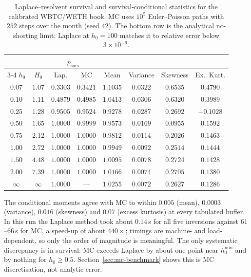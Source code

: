 \documentclass[11pt]{article}
\theoremstyle{plain}
\theoremstyle{definition}
\theoremstyle{remark}
\begin{document}
\begin{table}[ht]
\centering\small
\renewcommand{\arraystretch}{1.15}
\begin{tabular}{cc cc cccc}
\toprule
& & \multicolumn{2}{c}{$p_{\mathrm{surv}}$} & & & & \\
\cmidrule(lr){3-4}
$h_0$ & $H_0$ & Lap. & MC & Mean & Variance & Skewness & Ex.\ Kurt. \\
\midrule
$0.07$ & $1.07$ & $0.3303$ & $0.3421$ & $1.1035$ & $0.0322$ & $0.6535$ & $0.4790$ \\
$0.10$ & $1.11$ & $0.4879$ & $0.4985$ & $1.0413$ & $0.0306$ & $0.6320$ & $0.3989$ \\
$0.25$ & $1.28$ & $0.9505$ & $0.9524$ & $0.9278$ & $0.0287$ & $0.2692$ & $-0.1028$ \\
$0.50$ & $1.65$ & $1.0000$ & $0.9999$ & $0.9573$ & $0.0169$ & $0.0955$ & $0.1592$ \\
$0.75$ & $2.12$ & $1.0000$ & $1.0000$ & $0.9812$ & $0.0114$ & $0.2026$ & $0.1463$ \\
$1.00$ & $2.72$ & $1.0000$ & $1.0000$ & $0.9949$ & $0.0092$ & $0.2514$ & $0.1444$ \\
$1.50$ & $4.48$ & $1.0000$ & $1.0000$ & $1.0095$ & $0.0078$ & $0.2724$ & $0.1428$ \\
$2.00$ & $7.39$ & $1.0000$ & $1.0000$ & $1.0166$ & $0.0074$ & $0.2705$ & $0.1380$ \\
\midrule
$\infty$ & $\infty$ & $1.0000$ & --- & $1.0255$ & $0.0072$ & $0.2627$ & $0.1286$ \\
\bottomrule
\end{tabular}
\caption{Laplace--resolvent survival and survival-conditional statistics for the calibrated
WBTC/WETH book. MC uses $10^5$ Euler--Poisson paths with $252$ steps over the month (seed 42). The
bottom row is the analytical no-shorting limit; Laplace at $h_0=100$ matches it to relative error
below $3\times10^{-6}$.}
\label{tab:results}
\end{table}

The conditional moments agree with MC to within $0.005$ (mean), $0.0003$ (variance), $0.016$
(skewness) and $0.07$ (excess kurtosis) at every tabulated buffer. In this run the Laplace method
took about $0.14$\,s for all five inversions against $61$--$66$\,s for MC, a speed-up of about
$440\times$; timings are machine- and load-dependent, so only the order of magnitude is meaningful. The only systematic discrepancy is in survival: MC exceeds Laplace by about one point near
$h_0^{\min}$ and by nothing for $h_0\ge0.5$. Section~\ref{sec:mc-benchmark} shows this is MC
discretisation, not analytic error.
\end{document}
